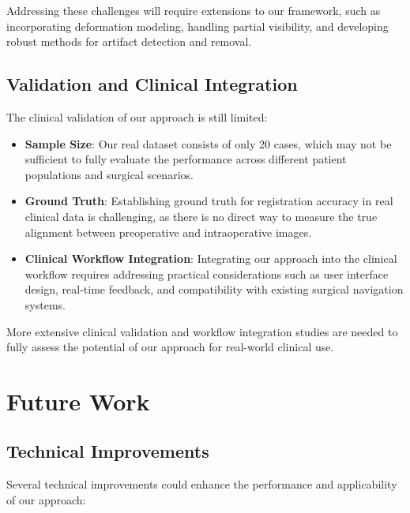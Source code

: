 Addressing these challenges will require extensions to our framework, such as incorporating deformation modeling, handling partial visibility, and developing robust methods for artifact detection and removal.

\subsection{Validation and Clinical Integration}
The clinical validation of our approach is still limited:

\begin{itemize}
    \item \textbf{Sample Size}: Our real dataset consists of only 20 cases, which may not be sufficient to fully evaluate the performance across different patient populations and surgical scenarios.
    
    \item \textbf{Ground Truth}: Establishing ground truth for registration accuracy in real clinical data is challenging, as there is no direct way to measure the true alignment between preoperative and intraoperative images.
    
    \item \textbf{Clinical Workflow Integration}: Integrating our approach into the clinical workflow requires addressing practical considerations such as user interface design, real-time feedback, and compatibility with existing surgical navigation systems.
\end{itemize}

More extensive clinical validation and workflow integration studies are needed to fully assess the potential of our approach for real-world clinical use.

\section{Future Work}

\subsection{Technical Improvements}
Several technical improvements could enhance the performance and applicability of our approach:

